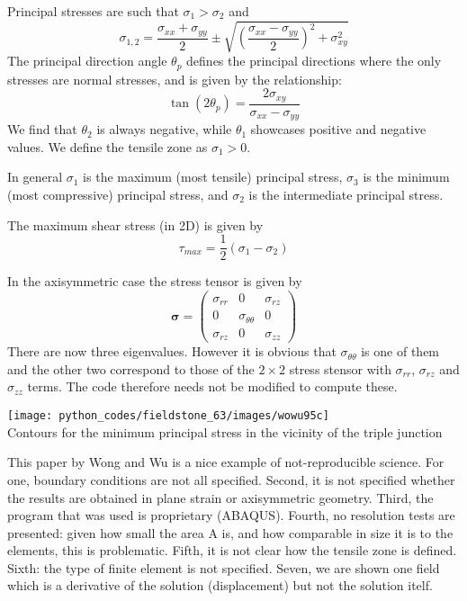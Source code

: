 Principal stresses are such that $\sigma_1>\sigma_2$ and 
\[
\sigma_{1,2}=\frac{\sigma_{xx}+\sigma_{yy}}{2} 
\pm \sqrt{  \left(\frac{\sigma_{xx}-\sigma_{yy}}{2}\right)^2 +\sigma_{xy}^2 }
 \]
The principal direction angle $\theta_p$ defines the principal
directions where the only stresses are normal stresses, and 
is given by the relationship:
\[
\tan (2\theta_p) =  \frac{2 \sigma_{xy}}{\sigma_{xx} -\sigma_{yy}}
\]
We find that $\theta_2$ is always negative, while $\theta_1$ showcases positive and negative values. 
We define the tensile zone as $\sigma_1>0$.

In general $\sigma_1$ is the maximum (most tensile) principal stress, 
$\sigma_3$ is the minimum (most compressive) principal stress, 
and $\sigma_2$ is the intermediate principal stress.

The maximum shear stress (in 2D) is given by
\[
\tau_{max} = \frac12(\sigma_1-\sigma_2)
\]

In the axisymmetric case the stress tensor is given by 
\[
{\bm \sigma} = 
\left(
\begin{array}{ccc}
\sigma_{rr} & 0 & \sigma_{rz} \\
0 & \sigma_{\theta\theta} & 0 \\
\sigma_{rz} & 0 & \sigma_{zz} 
\end{array}
\right)
\]
There are now three eigenvalues. However it is obvious that $\sigma_{\theta\theta}$ is 
one of them and the other two correspond to those of the $2\times 2$ stress stensor with 
$\sigma_{rr}$, $\sigma_{rz}$ and $\sigma_{zz}$ terms.
The code therefore needs not be modified to compute these. 



\begin{center}
\texttt{[image: python\_codes/fieldstone\_63/images/wowu95c]}\\
{\captionfont Contours for the minimum principal stress in the vicinity of the triple junction}
\end{center}

\begin{remark}
This paper by Wong and Wu is a nice example of not-reproducible science. For one, boundary conditions 
are not all specified. Second, it is not specified whether the results are obtained in plane strain 
or axisymmetric geometry. Third, the program that was used is proprietary (ABAQUS). 
Fourth, no resolution tests are presented: given how small the area A is, and how comparable 
in size it is to the elements, this is problematic. Fifth, it is not clear how the 
tensile zone is defined. Sixth: the type of finite element is not specified. Seven, 
we are shown one field which is a derivative of the solution (displacement) but not the 
solution itelf.  
\end{remark}

